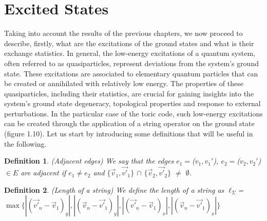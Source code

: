 \documentclass{Configuration_Files/PoliMi3i_thesis}
\newtheorem{definition}{Definition}[chapter]
\begin{document}





















\newpage
\section{Excited States}
\label{sec:ES}


Taking into account the results of the previous chapters, we now proceed to describe, firstly, what are the excitations of the ground states and what is their exchange statistics. In general, the low-energy excitations of a quantum system, often referred to as quasiparticles, represent deviations from the system's ground state. These excitations are associated to elementary quantum particles that can be created or annihilated with relatively low energy. The properties of these quasiparticles, including their statistics, are crucial for gaining insights into the system's ground state degeneracy, topological properties and response to external perturbations. \newline
In the particular case of the toric code, such low-energy excitations can be created through the application of a string operator on the ground state (figure 1.10). Let us start by introducing some definitions that will be useful in the following.

\begin{definition}(Adjacent edges)
	We say that the edges  $e_1=$($v_1,v_1'$), $e_2=$($v_2,v_2'$) $\in E$ are adjacent if $e_1\neq e_2$ and $\{ \vec{v}_1, \vec{v'}_1\}$ $\cap $ $\{ \vec{v}_2, \vec{v'}_2\}$ $\neq$ $\emptyset$.
\end{definition}

\begin{definition}(Length of a string)
	We define the length of a string as $\ell_\Sigma$=$\max \{ |(\vec{v'}_n-\vec{v}_1)_y|, |(\vec{v}_n-\vec{v'}_1)_y|, |(\vec{v'}_n-\vec{v}_1)_x|, |(\vec{v}_n-\vec{v'}_1)_x| \}$
\end{definition}
\end{document}
